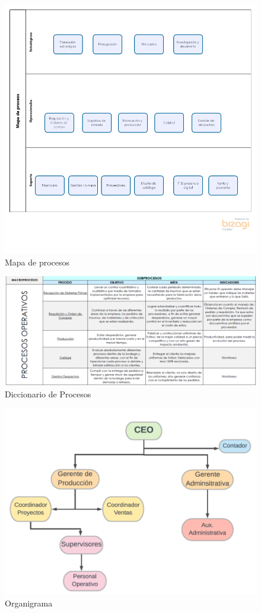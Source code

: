 \documentclass[11pt]{article}
\begin{document}
\begin{figure}[htbp]
\centering
\includegraphics[width=.9\linewidth]{./assets/build/mapa_procesos.png}
\caption{\label{fig:mapa_procesos}Mapa de procesos}
\end{figure}

\begin{figure}[htbp]
\centering
\includegraphics[width=.9\linewidth]{./assets/build/diccionario_procesos.png}
\caption{\label{fig:dic_procesos}Diccionario de Procesos}
\end{figure}

\begin{figure}[htbp]
\centering
\includegraphics[width=.9\linewidth]{./assets/build/organigrama.png}
\caption{\label{fig:organigrama}Organigrama}
\end{figure}
\end{document}
